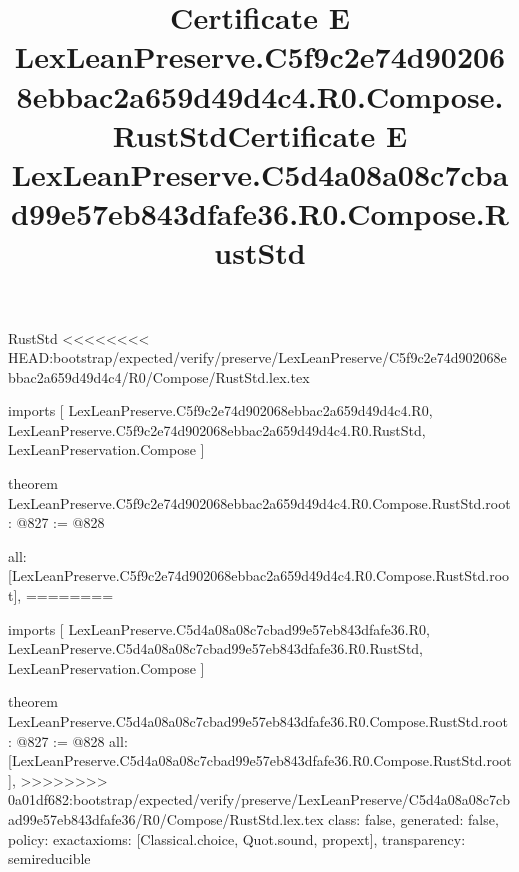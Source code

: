 \begin{lexlean}{RustStd}
<<<<<<<< HEAD:bootstrap/expected/verify/preserve/LexLeanPreserve/C5f9c2e74d902068ebbac2a659d49d4c4/R0/Compose/RustStd.lex.tex
\title{Certificate E LexLeanPreserve.C5f9c2e74d902068ebbac2a659d49d4c4.R0.Compose.RustStd}
\begin{coremodule}
imports [
  LexLeanPreserve.C5f9c2e74d902068ebbac2a659d49d4c4.R0,
  LexLeanPreserve.C5f9c2e74d902068ebbac2a659d49d4c4.R0.RustStd,
  LexLeanPreservation.Compose
]

theorem LexLeanPreserve.C5f9c2e74d902068ebbac2a659d49d4c4.R0.Compose.RustStd.root : @827 := @828 {
  all: [LexLeanPreserve.C5f9c2e74d902068ebbac2a659d49d4c4.R0.Compose.RustStd.root],
========
\title{Certificate E LexLeanPreserve.C5d4a08a08c7cbad99e57eb843dfafe36.R0.Compose.RustStd}
\begin{coremodule}
imports [
  LexLeanPreserve.C5d4a08a08c7cbad99e57eb843dfafe36.R0,
  LexLeanPreserve.C5d4a08a08c7cbad99e57eb843dfafe36.R0.RustStd,
  LexLeanPreservation.Compose
]

theorem LexLeanPreserve.C5d4a08a08c7cbad99e57eb843dfafe36.R0.Compose.RustStd.root : @827 := @828 {
  all: [LexLeanPreserve.C5d4a08a08c7cbad99e57eb843dfafe36.R0.Compose.RustStd.root],
>>>>>>>> 0a01df682:bootstrap/expected/verify/preserve/LexLeanPreserve/C5d4a08a08c7cbad99e57eb843dfafe36/R0/Compose/RustStd.lex.tex
  class: false,
  generated: false,
  policy: exact{axioms: [Classical.choice, Quot.sound, propext]},
  transparency: semireducible
}


\end{coremodule}}
\end{coremodule}
\end{lexlean}
